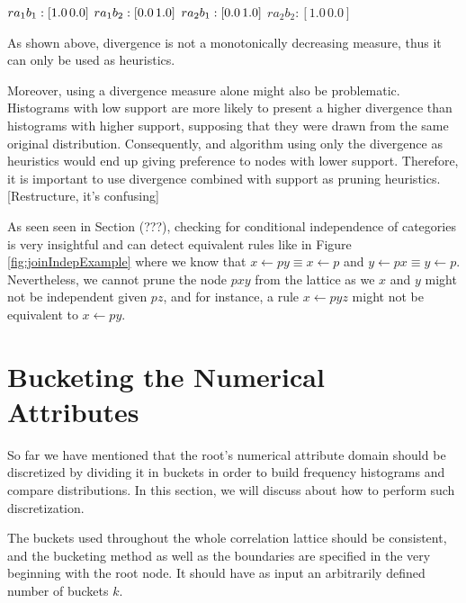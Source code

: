 $r a_1 b_1 : [1.0 \, 0.0] \\$
$r a_1 b_2 : [0.0 \, 1.0] \\$
$r a_2 b_1 : [0.0 \, 1.0] \\$
$r a_2 b_2 : [1.0 \, 0.0]$

As shown above, divergence is not a monotonically decreasing measure, thus it can only be used as heuristics.


Moreover, using a divergence measure alone might also be problematic. Histograms with low support are more likely to
present a higher divergence than histograms with higher support, supposing that they were drawn from the same original
distribution. Consequently, and algorithm using only the divergence as heuristics would end up giving preference to
nodes with lower support. Therefore, it is important to use divergence combined with support as pruning heuristics.
[Restructure, it's confusing]




As seen seen in Section (???), checking for conditional independence of categories is very insightful and
can detect equivalent rules like in Figure \ref{fig:joinIndepExample} where we know that 
$x \leftarrow py \equiv x \leftarrow p$ and $y \leftarrow px \equiv y \leftarrow p$. Nevertheless, we cannot prune the
node $pxy$ from the lattice as we $x$ and $y$ might not be independent given $pz$, and for instance, a rule $x
\leftarrow pyz$ might not be equivalent to $x \leftarrow py$.

\section{Bucketing the Numerical Attributes}

So far we have mentioned that the root's numerical attribute domain should be discretized by dividing it in buckets in
order to build frequency histograms and compare distributions. In this section, we will discuss about how to perform
such discretization.

The buckets used throughout the whole correlation lattice should be consistent, and the bucketing method as well as the
boundaries are specified in the very beginning with the root node. It should have as input an arbitrarily defined number
of buckets $k$.

